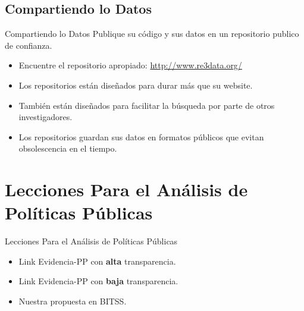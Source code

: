 \documentclass{beamer}
\begin{document}
\subsection*{Compartiendo lo Datos}
\begin{frame}{Compartiendo lo Datos}
Publique su código y sus datos en un repositorio publico de confianza.\begin{itemize}[<.->]
\item
Encuentre el repositorio apropiado: \url{http://www.re3data.org/}
\item
Los repositorios están diseñados para durar más que su website.
\item
También están diseñados para facilitar la búsqueda por parte de otros investigadores.
\item
Los repositorios guardan sus datos en formatos públicos que evitan obsolescencia en el tiempo.
\end{itemize}
\end{frame}

\section{Lecciones Para el Análisis de Políticas Públicas}

\begin{frame}{Lecciones Para el Análisis de Políticas Públicas}
\begin{itemize}
\item Link Evidencia-PP con \textbf{alta} transparencia. 
\item Link Evidencia-PP con \textbf{baja} transparencia. 
\item Nuestra propuesta en BITSS.
\end{itemize}
\end{frame}
\end{document}
